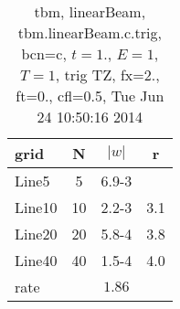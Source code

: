 \begin{table}[hbt]\tableFont %
\begin{center}
\begin{tabular}{|l|c|c|c|} \hline 
grid  & N &  $\vert w \vert$   & r \\ \hline 
               Line5 &     5 & \num{6.9}{-3} &       \\ \hline
              Line10 &    10 & \num{2.2}{-3} &  3.1  \\ \hline
              Line20 &    20 & \num{5.8}{-4} &  3.8  \\ \hline
              Line40 &    40 & \num{1.5}{-4} &  4.0  \\ \hline
    rate             &       &  $1.86$       &       \\ \hline
\end{tabular}
\caption{tbm, linearBeam, tbm.linearBeam.c.trig, bcn=c, $t=1.$, $E=1$, $T=1$,  trig TZ, fx=2., ft=0., cfl=0.5, Tue Jun 24 10:50:16 2014}\label{table:tbm.linearBeam.c.trig}
\end{center}
\end{table}
